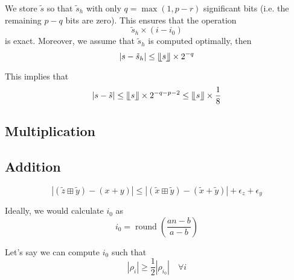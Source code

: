 \documentclass{article}
\DeclareMathOperator*{\round}{round}
\newcommand{\binadefloor}[1]{\llfloor #1 \rrfloor}
\begin{document}
We store $\tilde s$ so that $\tilde s_h$ with only $q = \max(1, p-r)$ significant bits (i.e. the remaining $p-q$ bits are zero). This ensures that the operation
\begin{equation*}
  \tilde s_h \times (i - i_0)
\end{equation*}
is exact. Moreover, we assume that $\tilde s_h$ is computed optimally, then
\begin{equation*}
  |s - \tilde s_h| \leq \binadefloor{s} \times 2^{-q}
\end{equation*}

This implies that
\begin{equation*}
  |s - \tilde s| \leq \binadefloor{s} \times 2^{-q-p-2} \leq \binadefloor{s} \times \frac{1}{8}
\end{equation*}


\subsection{Multiplication}
\label{sec:multiplication}


\subsection{Addition}
\label{sec:addition}

\begin{equation*}
  |(\tilde z \boxplus \tilde y) - (x + y) | \leq |(\tilde x \boxplus \tilde y) - (\tilde x + \tilde y)| + \epsilon_z + \epsilon_y
\end{equation*}


Ideally, we would calculate $i_0$ as
\begin{equation*}
  i_0 = \round \left(\frac{a n - b }{a-b} \right)
\end{equation*}

Let's say we can compute $i_0$ such that
\begin{equation*}
  |\rho_i| \geq \frac{1}{2} |\rho_{i_0}| \quad \forall i
\end{equation*}



\end{document}
